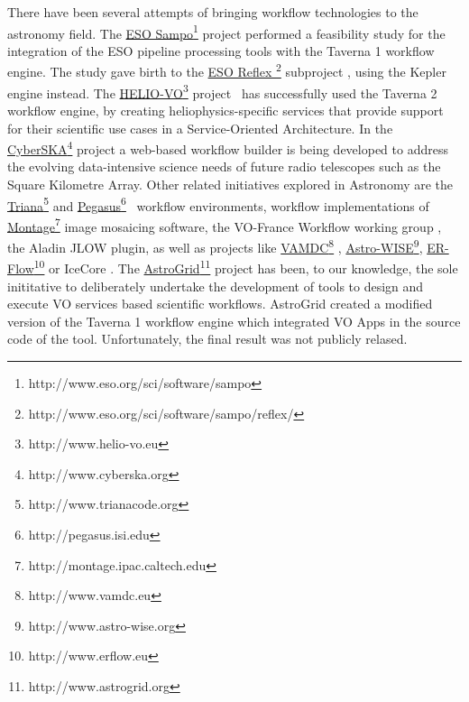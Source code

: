 \documentclass{aa}
\begin{document}
There have been several attempts of bringing workflow technologies to the astronomy field. The \href{http://www.eso.org/sci/software/sampo}{ESO Sampo}\footnote{http://www.eso.org/sci/software/sampo} project performed a feasibility study for the integration of the ESO pipeline processing tools with the Taverna 1 workflow engine. The study gave birth to the \href{http://www.eso.org/sci/software/sampo/reflex/}{ESO Reflex }\footnote{http://www.eso.org/sci/software/sampo/reflex/} subproject \citep{Hook2009}, using the Kepler engine \citep{Altintas2004} instead. The \href{http://www.helio-vo.eu/}{HELIO-VO}\footnote{http://www.helio-vo.eu} project~\textbf{\citep{Bentley2013}} has successfully used the Taverna 2 workflow engine, by creating heliophysics-specific services that provide support for their scientific use cases in a Service-Oriented Architecture. In the \href{http://www.cyberska.org}{CyberSKA}\footnote{http://www.cyberska.org} project \citep{Kiddle2011} a web-based workflow builder is being developed to address the evolving data-intensive science needs of future radio telescopes such as the Square Kilometre Array. Other related initiatives explored in Astronomy are the \href{http://www.trianacode.org}{Triana}\footnote{http://www.trianacode.org} \citep{Taylor2007} and \href{http://pegasus.isi.edu}{Pegasus}\footnote{http://pegasus.isi.edu}~\textbf{\citep{Deelman:2005:PFM:1239649.1239653}} workflow environments, workflow implementations of \href{http://montage.ipac.caltech.edu}{Montage}\footnote{http://montage.ipac.caltech.edu} image mosaicing software, the VO-France Workflow working group \citep{Schaaff2008}, the Aladin \citep{Bonnarel2000} JLOW plugin, as well as projects like \href{http://www.vamdc.eu}{VAMDC}\footnote{http://www.vamdc.eu} \citep{Walton2011}, \href{http://www.astro-wise.org}{Astro-WISE}\footnote{http://www.astro-wise.org}, \href{http://www.erflow.eu}{ER-Flow}\footnote{http://www.erflow.eu} or IceCore \citep{Maisala2012}. The \href{http://www.astrogrid.org}{AstroGrid}\footnote{http://www.astrogrid.org} project has been, to our knowledge, the sole inititative to deliberately undertake the development of tools to design and execute VO services based scientific workflows. AstroGrid created a modified version of the Taverna 1 workflow engine \citep{Benson2009, Walton2010} which integrated VO Apps in the source code of the tool. Unfortunately, the final result was not publicly relased.
\end{document}
